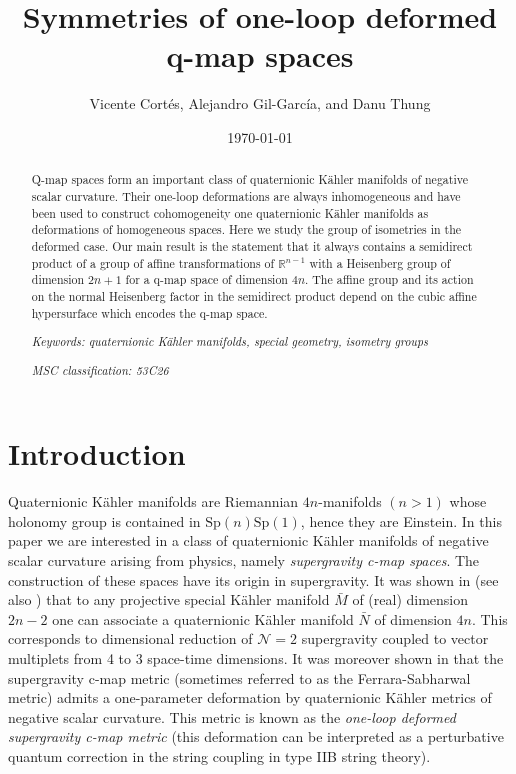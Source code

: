 \documentclass{article}
\title{\textbf{Symmetries of one-loop deformed q-map spaces}}
\author{Vicente Cortés, Alejandro Gil-García, and Danu Thung}
\affil{\normalsize Fachbereich Mathematik\\
	Universit\"at Hamburg\\
	Bundesstra\ss e 55, 20146 Hamburg, Germany\\
	vicente.cortes@uni-hamburg.de, alejandro.gil.garcia@uni-hamburg.de}
\date{\today}
\theoremstyle{definition}
\newcommand{\Sp}{\mathrm{Sp}}
\begin{document}
	
    \maketitle
	
    \begin{abstract}
    
    Q-map spaces form an important class of quaternionic K\"ahler manifolds of negative scalar curvature. Their one-loop deformations are always inhomogeneous and have been used to construct cohomogeneity one quaternionic K\"ahler manifolds as deformations of homogeneous spaces. Here we study the group of isometries in the deformed case. Our main result is the statement that it always contains a semidirect product of a group of affine transformations of $\mathbb{R}^{n-1}$ with a Heisenberg group of dimension $2n+1$ for a q-map space of dimension $4n$. The affine group and its action on the normal Heisenberg factor in the semidirect product depend on the cubic affine hypersurface which encodes the q-map space.\bigskip
    
    \emph{Keywords: quaternionic K\"ahler manifolds, special geometry, isometry groups}\medskip
    
    \emph{MSC classification: 53C26}
    
    \end{abstract}

    \clearpage

    \tableofcontents
	
    \section{Introduction}

    Quaternionic K\"ahler manifolds are Riemannian $4n$-manifolds $(n>1)$ whose holonomy group is contained in $\Sp(n)\Sp(1)$, hence they are Einstein. In this paper we are interested in a class of quaternionic K\"ahler manifolds of negative scalar curvature arising from physics, namely \emph{supergravity c-map spaces}. The construction of these spaces have its origin in supergravity. It was shown in \cite{FS90} (see also \cite{Hit09}) that to any projective special K\"ahler manifold $\bar{M}$ of (real) dimension $2n-2$ one can associate a quaternionic K\"ahler manifold $\bar{N}$ of dimension $4n$. This corresponds to dimensional reduction of $\mathcal{N}=2$ supergravity coupled to vector multiplets from 4 to 3 space-time dimensions. It was moreover shown in \cite{RSV06} that the supergravity c-map metric (sometimes referred to as the Ferrara-Sabharwal metric) admits a one-parameter deformation by quaternionic K\"ahler metrics of negative scalar curvature. This metric is known as the \emph{one-loop deformed supergravity c-map metric} (this deformation can be interpreted as a perturbative quantum correction in the string coupling in type IIB string theory).\medskip
    
\end{document}
